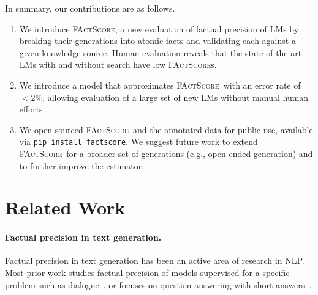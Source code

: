 \documentclass[11pt]{article}
\newcommand{\ours}{\textsc{FActScore}}
\newcommand{\ourScores}{\textsc{FActScore}s}
\newcommand{\pw}[1]{%
}
\begin{document}


In summary, our contributions are as follows.
\vspace{-.3em}
\begin{enumerate}[leftmargin=15pt]\itemsep -.2em
    \item We introduce \ours, a new evaluation of factual precision of LMs by breaking their generations into atomic facts and validating each against a given knowledge source. Human evaluation reveals that the state-of-the-art LMs with and without search have low \ourScores. %
    \item We introduce a model that approximates \ours\ with an error rate of $<2\%$, allowing evaluation of a large set of new LMs without manual human efforts.
    \item We open-sourced \ours\ and the annotated data for public use, available via \texttt{pip install factscore}.
    We suggest future work to extend \ours\ for a broader set of generations (e.g., open-ended generation) and to further improve the estimator.
\end{enumerate}
\pw{Overall, I think the introduction could frame this paper more clearly in the context of prior work: what is the key idea and how is it different from prior work? And what are the results/analysis/insights that this idea enables?}

\section{Related Work}\label{sec:related}
\paragraph{Factual precision in text generation.}

Factual precision in text generation %
has been an active area of research in NLP. 
Most prior work studies factual precision of models supervised for a specific problem such as dialogue~\citep{shuster2021retrieval}, or focuses on question answering with short answers~\citep{kadavath2022language,kandpal2022large,mallen2022not,nori2023capabilities}.
\end{document}
